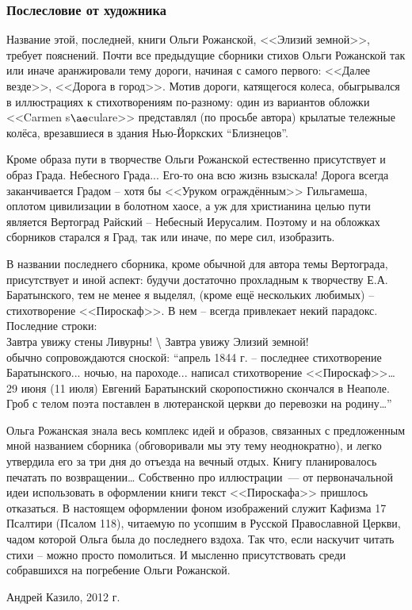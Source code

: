 \begin{center}
\subsubsection*{Послесловие от художника}
\end{center}

Название этой, последней, книги Ольги Рожанской, <<Элизий земной>>, требует пояснений.
Почти все предыдущие сборники стихов Ольги Рожанской так или иначе аранжировали тему дороги, начиная с самого первого: <<Далее везде>>, <<Дорога в город>>.
Мотив дороги, катящегося колеса, обыгрывался в иллюстрациях к стихотворениям по-разному: один из вариантов обложки <<Carmen s$\ae$culare>> представлял (по просьбе автора) крылатые тележные колёса, врезавшиеся в здания Нью-Йоркских ``Близнецов''.

Кроме образа пути в творчестве Ольги Рожанской естественно присутствует и образ Града. Небесного Града... Его-то она всю жизнь взыскала! 
Дорога всегда заканчивается Градом -- хотя бы <<Уруком  ограждённым>> Гильгамеша, оплотом цивилизации в болотном хаосе, а уж для христианина целью пути является Вертоград Райский -- Небесный Иерусалим. Поэтому и на обложках сборников старался я Град, так или иначе, по мере сил, изобразить. 

В названии последнего сборника, кроме обычной для автора темы Вертограда, присутствует и иной аспект: будучи достаточно прохладным к творчеству Е.А. Баратынского, тем не менее я выделял, 
(кроме ещё нескольких любимых) -- стихотворение <<Пироскаф>>. 
В нем -- всегда привлекает некий парадокс. Последние строки:\\
Завтра увижу стены Ливурны! \textbackslash{} Завтра увижу Элизий земной!\\
обычно сопровождаются сноской: 
``апрель 1844 г. -- последнее стихотворение Баратынского... ночью, на пароходе... написал стихотворение <<Пироскаф>>\ldots 29 июня (11 июля) Евгений Баратынский скоропостижно скончался в Неаполе. Гроб с телом поэта поставлен в лютеранской церкви до перевозки на родину\ldots''

Ольга Рожанская знала весь комплекс идей и образов, связанных с 
предложенным мной названием сборника (обговоривали мы эту тему неоднократно), и 
легко утвердила его за три дня до отъезда на вечный отдых. Книгу планировалось печатать по возвращении\ldots
Собственно про иллюстрации~--- от первоначальной идеи использовать в оформлении книги текст <<Пироскафа>> пришлось отказаться. 
В настоящем оформлении фоном изображений служит Кафизма 17 Псалтири (Псалом 118), читаемую по усопшим 
в Русской Православной Церкви, чадом которой Ольга была до последнего вздоха. 
Так что, если наскучит читать стихи -- можно просто помолиться. И мысленно присутствовать среди собравшихся на погребение Ольги Рожанской.

\begin{flushright}
Андрей Казило, 2012 г.
\end{flushright}
\clearpage

